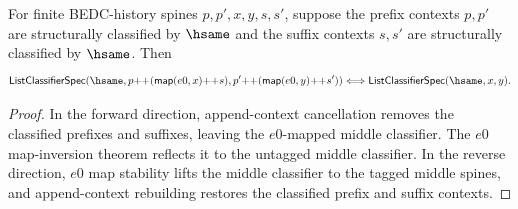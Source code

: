 \begin{theorem}
\label{thm:list-classifier-hsame-map-e0-append-context-iff}
For finite BEDC-history spines $p,p',x,y,s,s'$, suppose the prefix contexts
$p,p'$ are structurally classified by $\hsame$ and the suffix contexts $s,s'$
are structurally classified by $\hsame$. Then
$$
\mathsf{ListClassifierSpec}(\hsame,
  p{++}(\mathsf{map}(e0,x){++}s),
  p'{++}(\mathsf{map}(e0,y){++}s'))
\Longleftrightarrow
\mathsf{ListClassifierSpec}(\hsame,x,y).
$$
\end{theorem}
\begin{proof}
In the forward direction, append-context cancellation removes the classified
prefixes and suffixes, leaving the $e0$-mapped middle classifier. The $e0$
map-inversion theorem reflects it to the untagged middle classifier. In the
reverse direction, $e0$ map stability lifts the middle classifier to the tagged
middle spines, and append-context rebuilding restores the classified prefix and
suffix contexts.
\end{proof}

